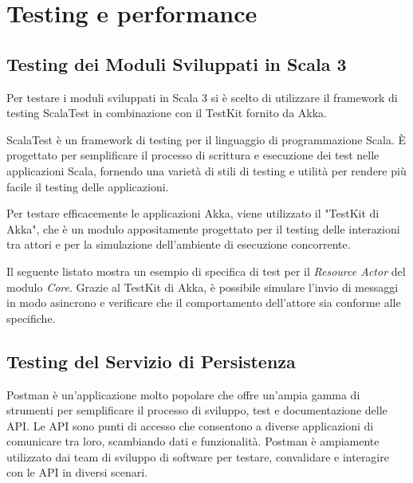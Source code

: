 \documentclass[12pt]{article}
\begin{document}
\newpage



\section{Testing e performance}

\subsection{Testing dei Moduli Sviluppati in Scala 3}

Per testare i moduli sviluppati in Scala 3 si è scelto di utilizzare il framework di testing ScalaTest in combinazione con il TestKit fornito da Akka.

ScalaTest è un framework di testing per il linguaggio di programmazione Scala. È progettato per semplificare il processo di scrittura e esecuzione dei test nelle applicazioni Scala, fornendo una varietà di stili di testing e utilità per rendere più facile il testing delle applicazioni.

Per testare efficacemente le applicazioni Akka, viene utilizzato il "TestKit di Akka", che è un modulo appositamente progettato per il testing delle interazioni tra attori e per la simulazione dell'ambiente di esecuzione concorrente.

Il seguente listato mostra un esempio di specifica di test per il \textit{Resource Actor} del modulo \textit{Core}. Grazie al TestKit di Akka, è possibile simulare l'invio di messaggi in modo asincrono e verificare che il comportamento dell'attore sia conforme alle specifiche.



\subsection{Testing del Servizio di Persistenza}

Postman è un'applicazione molto popolare che offre un'ampia gamma di strumenti per semplificare il processo di sviluppo, test e documentazione delle API. Le API sono punti di accesso che consentono a diverse applicazioni di comunicare tra loro, scambiando dati e funzionalità. Postman è ampiamente utilizzato dai team di sviluppo di software per testare, convalidare e interagire con le API in diversi scenari.
\end{document}
